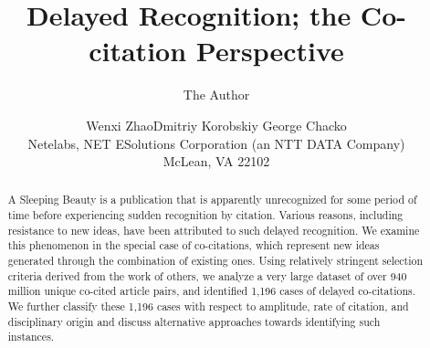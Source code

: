 \documentclass[11pt, oneside]{article}   	%
\title{Delayed Recognition; the Co-citation Perspective}
\author{The Author}
\author{Wenxi Zhao\qquad Dmitriy Korobskiy \qquad George Chacko\\Netelabs, NET ESolutions Corporation (an NTT DATA Company)\\ McLean, VA 22102}
\begin{document}
\maketitle




\maketitle

\begin{abstract}
A Sleeping Beauty is a publication that is apparently unrecognized for some period of time before experiencing sudden recognition by citation. Various reasons, including resistance to new ideas, have been attributed to such delayed recognition. We examine this phenomenon in the special case of co-citations, which represent new ideas generated through the combination of existing ones. Using relatively stringent selection criteria derived from the work of others, we analyze a very large dataset of over 940 million unique co-cited article pairs, and identified 1,196 cases of delayed co-citations. We further classify these 1,196 cases with respect to amplitude, rate of citation, and disciplinary origin and discuss alternative approaches towards identifying such instances.

\end{abstract}
\end{document}
